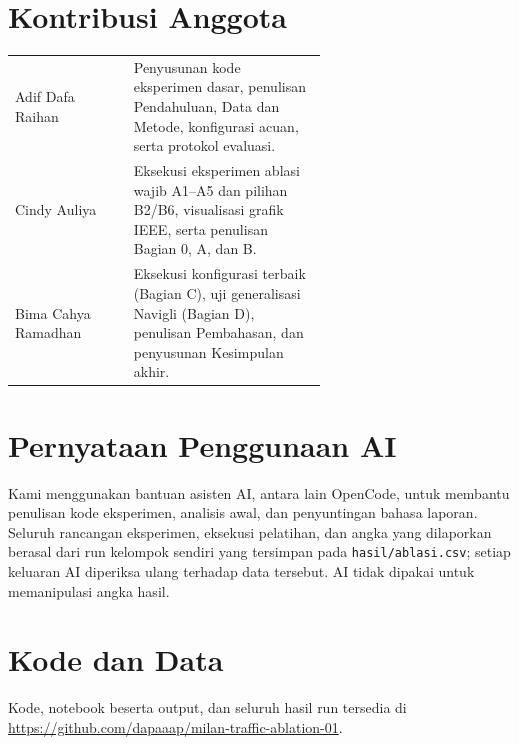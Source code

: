 \documentclass[conference,a4paper]{IEEEtran}
\begin{document}
\section*{Kontribusi Anggota}
\begin{tabular}{@{}lp{0.62\linewidth}@{}}
  Adif Dafa Raihan & Penyusunan kode eksperimen dasar, penulisan Pendahuluan, Data dan Metode, konfigurasi acuan, serta protokol evaluasi. \\
  Cindy Auliya & Eksekusi eksperimen ablasi wajib A1--A5 dan pilihan B2/B6, visualisasi grafik IEEE, serta penulisan Bagian 0, A, dan B. \\
  Bima Cahya Ramadhan & Eksekusi konfigurasi terbaik (Bagian C), uji generalisasi Navigli (Bagian D), penulisan Pembahasan, dan penyusunan Kesimpulan akhir. \\
\end{tabular}

\section*{Pernyataan Penggunaan AI}
Kami menggunakan bantuan asisten AI, antara lain OpenCode, untuk membantu penulisan kode eksperimen, analisis awal, dan penyuntingan bahasa laporan. Seluruh rancangan eksperimen, eksekusi pelatihan, dan angka yang dilaporkan berasal dari run kelompok sendiri yang tersimpan pada \texttt{hasil/ablasi.csv}; setiap keluaran AI diperiksa ulang terhadap data tersebut. AI tidak dipakai untuk memanipulasi angka hasil.

\section*{Kode dan Data}
Kode, notebook beserta output, dan seluruh hasil run tersedia di \url{https://github.com/dapaaap/milan-traffic-ablation-01}.



\end{document}
